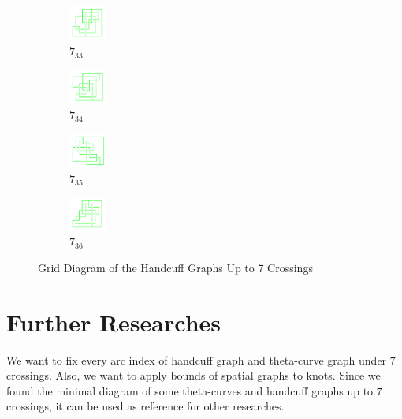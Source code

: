 \documentclass{article}
\theoremstyle{definition}
\theoremstyle{theorem}
\theoremstyle{proposition}
\theoremstyle{corollary}
\begin{document}
\begin{figure}[H]
\begin{subfigure}{0.075\textwidth}
    \includegraphics[width=1.25cm]{../Midterm_Poster/grid_diagram/handcuff_7_33.png}
    \caption{$7_{33}$} 
    \end{subfigure}
    \begin{subfigure}{0.075\textwidth}
    \includegraphics[width=1.25cm]{../Midterm_Poster/grid_diagram/handcuff_7_34.png}
    \caption{$7_{34}$} 
    \end{subfigure}
    \begin{subfigure}{0.075\textwidth}
    \includegraphics[width=1.25cm]{../Midterm_Poster/grid_diagram/handcuff_7_35.png}
    \caption{$7_{35}$} 
    \end{subfigure}
    \begin{subfigure}{0.075\textwidth}
    \includegraphics[width=1.25cm]{../Midterm_Poster/grid_diagram/handcuff_7_36.png}
    \caption{$7_{36}$} 
    \end{subfigure}
    \caption{Grid Diagram of the Handcuff Graphs Up to 7 Crossings}
  \end{figure}


\section{Further Researches}
    We want to fix every arc index of handcuff graph and theta-curve graph under $7$ crossings.
    Also, we want to apply bounds of spatial graphs to knots.
    Since we found the minimal diagram of some theta-curves and handcuff graphs up to $7$ crossings, it can be used as reference for other researches.
\end{document}
